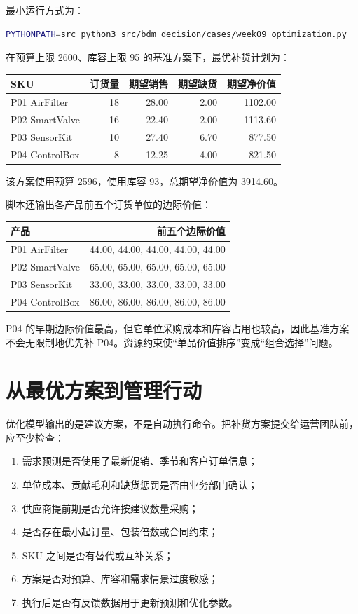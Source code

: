 \documentclass[UTF8,fontset=fandol,openany,zihao=-4]{ctexbook}
\begin{document}
最小运行方式为：
\begin{lstlisting}[language=bash,caption={运行第9周补货优化案例}]
PYTHONPATH=src python3 src/bdm_decision/cases/week09_optimization.py
\end{lstlisting}

在预算上限 2600、库容上限 95 的基准方案下，最优补货计划为：
\begin{center}
\begin{tabular}{lrrrr}
\toprule
SKU & 订货量 & 期望销售 & 期望缺货 & 期望净价值\\
\midrule
P01 AirFilter & 18 & 28.00 & 2.00 & 1102.00\\
P02 SmartValve & 16 & 22.40 & 2.00 & 1113.60\\
P03 SensorKit & 10 & 27.40 & 6.70 & 877.50\\
P04 ControlBox & 8 & 12.25 & 4.00 & 821.50\\
\bottomrule
\end{tabular}
\end{center}
该方案使用预算 2596，使用库容 93，总期望净价值为 3914.60。

脚本还输出各产品前五个订货单位的边际价值：
\begin{center}
\begin{tabular}{lr}
\toprule
产品 & 前五个边际价值\\
\midrule
P01 AirFilter & 44.00, 44.00, 44.00, 44.00, 44.00\\
P02 SmartValve & 65.00, 65.00, 65.00, 65.00, 65.00\\
P03 SensorKit & 33.00, 33.00, 33.00, 33.00, 33.00\\
P04 ControlBox & 86.00, 86.00, 86.00, 86.00, 86.00\\
\bottomrule
\end{tabular}
\end{center}
P04 的早期边际价值最高，但它单位采购成本和库容占用也较高，因此基准方案不会无限制地优先补 P04。资源约束使“单品价值排序”变成“组合选择”问题。

\section{从最优方案到管理行动}

优化模型输出的是建议方案，不是自动执行命令。把补货方案提交给运营团队前，应至少检查：
\begin{enumerate}
  \item 需求预测是否使用了最新促销、季节和客户订单信息；
  \item 单位成本、贡献毛利和缺货惩罚是否由业务部门确认；
  \item 供应商提前期是否允许按建议数量采购；
  \item 是否存在最小起订量、包装倍数或合同约束；
  \item SKU 之间是否有替代或互补关系；
  \item 方案是否对预算、库容和需求情景过度敏感；
  \item 执行后是否有反馈数据用于更新预测和优化参数。
\end{enumerate}
\end{document}
